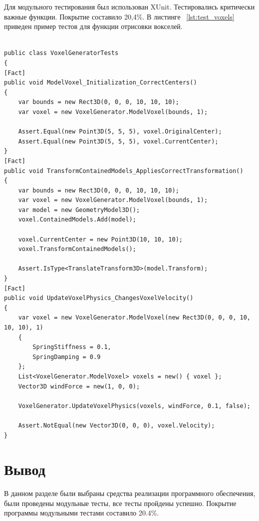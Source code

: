 Для модульного тестирования был использован XUnit. Тестировались критически важные функции. Покрытие составило 20,4\%. В листинге ~\ref{lst:test_voxels} приведен пример тестов для функции отрисовки вокселей.
\newpage
\begin{lstlisting}[caption={Тест для функций отрисовки вокселей},label={lst:test_voxels}]

public class VoxelGeneratorTests
{
[Fact]
public void ModelVoxel_Initialization_CorrectCenters()
{
	var bounds = new Rect3D(0, 0, 0, 10, 10, 10);
	var voxel = new VoxelGenerator.ModelVoxel(bounds, 1);
	
	Assert.Equal(new Point3D(5, 5, 5), voxel.OriginalCenter);
	Assert.Equal(new Point3D(5, 5, 5), voxel.CurrentCenter);
}
[Fact]
public void TransformContainedModels_AppliesCorrectTransformation()
{
	var bounds = new Rect3D(0, 0, 0, 10, 10, 10);
	var voxel = new VoxelGenerator.ModelVoxel(bounds, 1);
	var model = new GeometryModel3D();
	voxel.ContainedModels.Add(model);
	
	voxel.CurrentCenter = new Point3D(10, 10, 10);
	voxel.TransformContainedModels();
	
	Assert.IsType<TranslateTransform3D>(model.Transform);
}
[Fact]
public void UpdateVoxelPhysics_ChangesVoxelVelocity()
{
	var voxel = new VoxelGenerator.ModelVoxel(new Rect3D(0, 0, 0, 10, 10, 10), 1)
	{
		SpringStiffness = 0.1,
		SpringDamping = 0.9
	};
	List<VoxelGenerator.ModelVoxel> voxels = new() { voxel };
	Vector3D windForce = new(1, 0, 0);
	
	VoxelGenerator.UpdateVoxelPhysics(voxels, windForce, 0.1, false);
	
	Assert.NotEqual(new Vector3D(0, 0, 0), voxel.Velocity);
}

\end{lstlisting}

\section*{Вывод}
В данном разделе были выбраны средства реализации программного обеспечения, были проведены модульные тесты, все тесты пройдены успешно. Покрытие программы модульными тестами составило 20.4\%.
